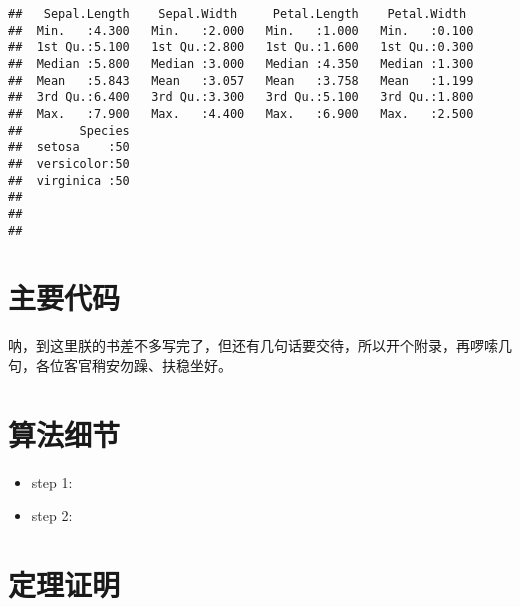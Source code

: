 \documentclass[a4paper,11pt,]{ctexbook}
\providecommand{\tightlist}{%
  \setlength{\itemsep}{0pt}\setlength{\parskip}{0pt}}
\theoremstyle{definition}
\theoremstyle{definition}
\theoremstyle{definition}
\theoremstyle{remark}
\begin{document}
\begin{verbatim}
##   Sepal.Length    Sepal.Width     Petal.Length    Petal.Width   
##  Min.   :4.300   Min.   :2.000   Min.   :1.000   Min.   :0.100  
##  1st Qu.:5.100   1st Qu.:2.800   1st Qu.:1.600   1st Qu.:0.300  
##  Median :5.800   Median :3.000   Median :4.350   Median :1.300  
##  Mean   :5.843   Mean   :3.057   Mean   :3.758   Mean   :1.199  
##  3rd Qu.:6.400   3rd Qu.:3.300   3rd Qu.:5.100   3rd Qu.:1.800  
##  Max.   :7.900   Max.   :4.400   Max.   :6.900   Max.   :2.500  
##        Species  
##  setosa    :50  
##  versicolor:50  
##  virginica :50  
##                 
##                 
## 
\end{verbatim}

\cleardoublepage 

\appendix {}


\chapter{主要代码}\label{sound}

呐，到这里朕的书差不多写完了，但还有几句话要交待，所以开个附录，再啰嗦几句，各位客官稍安勿躁、扶稳坐好。

\chapter{算法细节}

\begin{itemize}
\tightlist
\item
  step 1:
\item
  step 2:
\end{itemize}

\chapter{定理证明}



\end{document}
